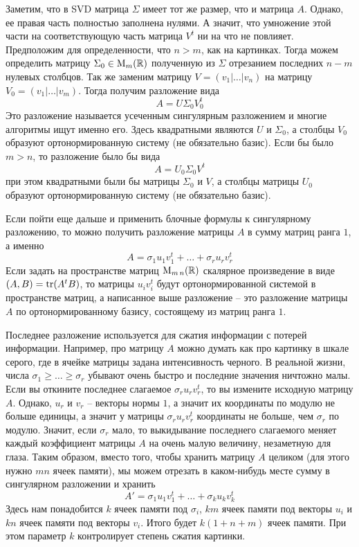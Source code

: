 Заметим, что в SVD матрица $\Sigma$ имеет тот же размер, что и матрица $A$.
Однако, ее правая часть полностью заполнена нулями.
А значит, что умножение этой части на соответствующую часть матрица $V^t$ ни на что не повлияет.
Предположим для определенности, что $n > m$, как на картинках.
Тогда можем определить матрицу $\Sigma_0\in \operatorname{M}_{m}(\mathbb R)$ полученную из $\Sigma$ отрезанием последних $n - m$ нулевых столбцов.
Так же заменим матрицу $V = (v_1|\ldots|v_n)$ на матрицу $V_0 = (v_1|\ldots|v_m)$.
Тогда получим разложение вида 
\[
A = U \Sigma_0 V_0^t
\]
Это разложение называется усеченным сингулярным разложением и многие алгоритмы ищут именно его.
Здесь квадратными являются $U$ и $\Sigma_0$, а столбцы $V_0$ образуют ортонормированную систему (не обязательно базис).
Если бы было $m > n$, то разложение было бы вида
\[
A = U_0 \Sigma_0 V^t
\]
при этом квадратными были бы матрицы $\Sigma_0$ и $V$, а столбцы матрицы $U_0$ образуют ортонормированную систему (не обязательно базис).


Если пойти еще дальше и применить блочные формулы к сингулярному разложению, то можно получить разложение матрицы $A$ в сумму матриц ранга $1$, а именно
\[
A = \sigma_1 u_1 v_1^t + \ldots + \sigma_r u_r v_r^t
\]
Если задать на пространстве матриц $\operatorname{M}_{m\,n}(\mathbb R)$ скалярное произведение в виде $(A, B) = \operatorname{tr}(A^t B)$, то матрицы $u_iv_i^t$ будут ортонормированной системой в пространстве матриц, а написанное выше разложение -- это разложение матрицы $A$ по ортонормированному базису, состоящему из матриц ранга $1$.

Последнее разложение используется для сжатия информации с потерей информации.
Например, про матрицу $A$ можно думать как про картинку в шкале серого, где в ячейке матрицы задана интенсивность черного.
В реальной жизни, числа $\sigma_1\geqslant \ldots \geqslant \sigma_r$ убывают очень быстро и последние значения ничтожно малы.
Если вы откините последнее слагаемое $\sigma_ru_rv_r^t$, то вы измените исходную матрицу $A$.
Однако, $u_r$ и $v_r$ -- векторы нормы $1$, а значит их координаты по модулю не больше единицы, а значит у матрицы $\sigma_r u_rv_r^t$ координаты не больше, чем $\sigma_r$ по модулю.
Значит, если $\sigma_r$  мало, то выкидывание последнего слагаемого меняет каждый коэффициент матрицы $A$ на очень малую величину, незаметную для глаза.
Таким образом, вместо того, чтобы хранить матрицу $A$ целиком (для этого нужно $mn$ ячеек памяти), мы можем отрезать в каком-нибудь месте сумму в сингулярном разложении и хранить
\[
A' = \sigma_1 u_1 v_1^t + \ldots + \sigma_k u_k v_k^t
\]
Здесь нам понадобится $k$ ячеек памяти под $\sigma_i$, $km$ ячеек памяти под векторы $u_i$ и $kn$ ячеек памяти под векторы $v_i$.
Итого будет $k(1 + n + m)$ ячеек памяти.
При этом параметр $k$ контролирует степень сжатия картинки.


